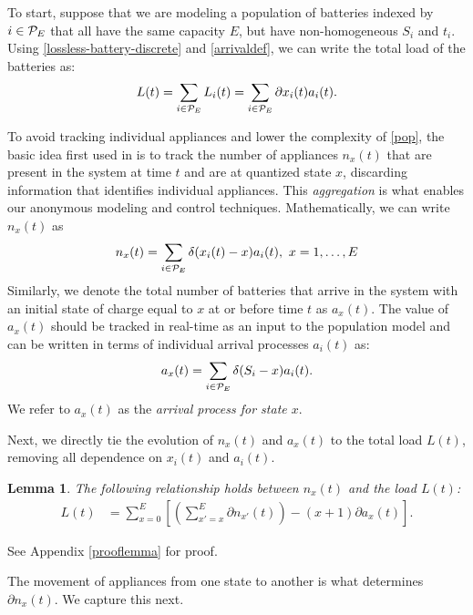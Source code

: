 \documentclass[10pt]{IEEEtran}
\newtheorem{lemma}[theorem]{Lemma}
\begin{document}
To start, suppose that we are modeling a population of batteries indexed by $i \in {\cal P}_E$ that all have the same capacity $E$, but have non-homogeneous $S_i$ and $t_i$. 
Using \eqref{lossless-battery-discrete} and \eqref{arrivaldef}, we can write the total load of the batteries as:
\begin{equation}\label{pop}
L(t)=\sum_{i\in {\cal P}_E}L_i(t)=\sum_{i\in {\cal P}_E}\partial x_i(t) a_i(t).
\end{equation}

To avoid tracking individual appliances and lower the complexity of \eqref{pop}, the basic idea first used  in \cite{chong85} is
to track the number of appliances $n_x(t)$ that are present in the system at time $t$ and are at quantized state $x$, discarding information that identifies individual appliances. This {\it aggregation} is what enables our anonymous modeling and control techniques. Mathematically, we can write $n_x(t)$ as
\begin{equation}\label{numberineachstate}
 n_x(t)=\sum_{i\in {\cal P}_E}\delta(x_i(t)-x)a_i(t),~x=1,\ldots,E
\end{equation} 
Similarly, we denote the total number of batteries that arrive in the system with an initial state of charge equal to $x$ at or before time $t$ as $a_x(t)$. The value of $a_x(t)$ should be tracked in real-time as an input to the population model and can be written in terms of individual arrival processes $a_i(t)$ as:
\begin{equation}\label{apx}
 a_x(t)=\sum_{i\in {\cal P}_E}\delta(S_i-x)  a_i(t).
\end{equation}
We refer to $a_x(t)$ as the {\it arrival process for state $x$}.


Next, we directly tie the evolution of $n_x(t)$ and $a_x(t)$ to the total load $L(t)$, removing all dependence on $x_i(t)$ and $a_i(t)$.


\begin{lemma}\label{nxlemma}{\it 
The following relationship holds between $n_x(t)$ and the load $L(t)$:
\begin{align}\label{occur}
L(t) & = \sum_{x=0}^{E}\left[\left(\sum_{x'=x}^{E} \partial n_{x'}(t) \right) - (x+1)\partial a_{x}(t)\right].
\end{align}
}
\end{lemma}
 See Appendix \ref{prooflemma} for proof.

The movement of appliances from one state to another is what determines $\partial n_x(t)$. We capture this next.
\end{document}

